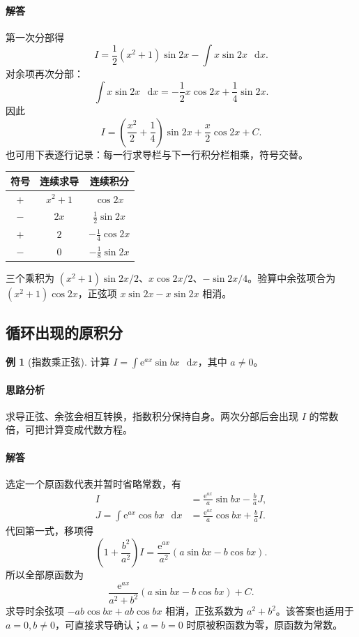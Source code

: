 \documentclass[UTF8,fontset=fandol,12pt,oneside,openany]{ctexrep}
\newcommand{\dd}{\mathop{}\!\mathrm d}
\newcommand{\ee}{\mathrm e}
\theoremstyle{definition}
\newtheorem{example}{例}[chapter]
\begin{document}
\paragraph{解答}第一次分部得
\[
I=\frac12(x^2+1)\sin2x-\int x\sin2x\,\dd x.
\]
对余项再次分部：
\[
\int x\sin2x\,\dd x=-\frac12x\cos2x+\frac14\sin2x.
\]
因此
\[
I=\left(\frac{x^2}2+\frac14\right)\sin2x+\frac x2\cos2x+C.
\]
也可用下表逐行记录：每一行求导栏与下一行积分栏相乘，符号交替。
\begin{center}
\begin{tabular}{ccc}
\toprule
符号 & 连续求导 & 连续积分\\
\midrule
$+$ & $x^2+1$ & $\cos2x$\\
$-$ & $2x$ & $\frac12\sin2x$\\
$+$ & $2$ & $-\frac14\cos2x$\\
$-$ & $0$ & $-\frac18\sin2x$\\
\bottomrule
\end{tabular}
\end{center}
三个乘积为 $(x^2+1)\sin2x/2$、$x\cos2x/2$、$-\sin2x/4$。验算中余弦项合为 $(x^2+1)\cos2x$，正弦项 $x\sin2x-x\sin2x$ 相消。

\subsection{循环出现的原积分}
\begin{example}[指数乘正弦]
计算 $I=\int\ee^{ax}\sin bx\,\dd x$，其中 $a\ne0$。
\end{example}
\paragraph{思路分析}求导正弦、余弦会相互转换，指数积分保持自身。两次分部后会出现 $I$ 的常数倍，可把计算变成代数方程。
\paragraph{解答}选定一个原函数代表并暂时省略常数，有
\begin{align*}
I&=\frac{\ee^{ax}}a\sin bx-\frac baJ,\\
J=\int\ee^{ax}\cos bx\,\dd x
&=\frac{\ee^{ax}}a\cos bx+\frac baI.
\end{align*}
代回第一式，移项得
\[
\left(1+\frac{b^2}{a^2}\right)I=
\frac{\ee^{ax}}{a^2}(a\sin bx-b\cos bx).
\]
所以全部原函数为
\[
\frac{\ee^{ax}}{a^2+b^2}(a\sin bx-b\cos bx)+C.
\]
求导时余弦项 $-ab\cos bx+ab\cos bx$ 相消，正弦系数为 $a^2+b^2$。该答案也适用于 $a=0,b\ne0$，可直接求导确认；$a=b=0$ 时原被积函数为零，原函数为常数。
\end{document}
